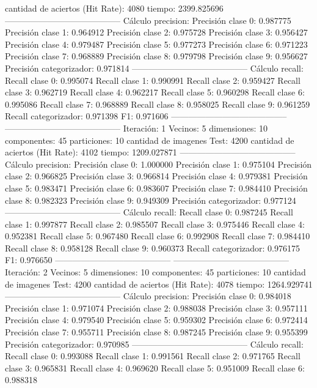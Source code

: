 cantidad de aciertos (Hit Rate): 4080
tiempo: 2399.825696
-----------------------------------------
Cálculo precision: 
Precisión clase 0: 0.987775
Precisión clase 1: 0.964912
Precisión clase 2: 0.975728
Precisión clase 3: 0.956427
Precisión clase 4: 0.979487
Precisión clase 5: 0.977273
Precisión clase 6: 0.971223
Precisión clase 7: 0.968889
Precisión clase 8: 0.979798
Precisión clase 9: 0.956627
Precisión categorizador: 0.971814
-----------------------------------------
Cálculo recall: 
Recall clase 0: 0.995074
Recall clase 1: 0.990991
Recall clase 2: 0.959427
Recall clase 3: 0.962719
Recall clase 4: 0.962217
Recall clase 5: 0.960298
Recall clase 6: 0.995086
Recall clase 7: 0.968889
Recall clase 8: 0.958025
Recall clase 9: 0.961259
Recall categorizador: 0.971398
F1: 0.971606
-----------------------------------------
-----------------------------------------
Iteración: 1
Vecinos: 5
dimensiones: 10
componentes: 45
particiones: 10
cantidad de imagenes Test: 4200
cantidad de aciertos (Hit Rate): 4102
tiempo: 1209.027871
-----------------------------------------
Cálculo precision: 
Precisión clase 0: 1.000000
Precisión clase 1: 0.975104
Precisión clase 2: 0.966825
Precisión clase 3: 0.966814
Precisión clase 4: 0.979381
Precisión clase 5: 0.983471
Precisión clase 6: 0.983607
Precisión clase 7: 0.984410
Precisión clase 8: 0.982323
Precisión clase 9: 0.949309
Precisión categorizador: 0.977124
-----------------------------------------
Cálculo recall: 
Recall clase 0: 0.987245
Recall clase 1: 0.997877
Recall clase 2: 0.985507
Recall clase 3: 0.975446
Recall clase 4: 0.952381
Recall clase 5: 0.967480
Recall clase 6: 0.992908
Recall clase 7: 0.984410
Recall clase 8: 0.958128
Recall clase 9: 0.960373
Recall categorizador: 0.976175
F1: 0.976650
-----------------------------------------
-----------------------------------------
Iteración: 2
Vecinos: 5
dimensiones: 10
componentes: 45
particiones: 10
cantidad de imagenes Test: 4200
cantidad de aciertos (Hit Rate): 4078
tiempo: 1264.929741
-----------------------------------------
Cálculo precision: 
Precisión clase 0: 0.984018
Precisión clase 1: 0.971074
Precisión clase 2: 0.988038
Precisión clase 3: 0.957111
Precisión clase 4: 0.979540
Precisión clase 5: 0.959302
Precisión clase 6: 0.972414
Precisión clase 7: 0.955711
Precisión clase 8: 0.987245
Precisión clase 9: 0.955399
Precisión categorizador: 0.970985
-----------------------------------------
Cálculo recall: 
Recall clase 0: 0.993088
Recall clase 1: 0.991561
Recall clase 2: 0.971765
Recall clase 3: 0.965831
Recall clase 4: 0.969620
Recall clase 5: 0.951009
Recall clase 6: 0.988318
